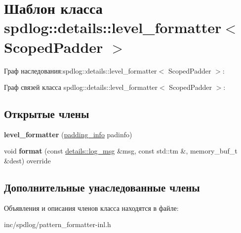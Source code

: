 \hypertarget{classspdlog_1_1details_1_1level__formatter}{}\section{Шаблон класса spdlog\+:\+:details\+:\+:level\+\_\+formatter$<$ Scoped\+Padder $>$}
\label{classspdlog_1_1details_1_1level__formatter}


Граф наследования\+:spdlog\+:\+:details\+:\+:level\+\_\+formatter$<$ Scoped\+Padder $>$\+:


Граф связей класса spdlog\+:\+:details\+:\+:level\+\_\+formatter$<$ Scoped\+Padder $>$\+:
\subsection*{Открытые члены}
\begin{DoxyCompactItemize}
\item 
\mbox{\label{classspdlog_1_1details_1_1level__formatter_a525f5622677202953cab0207f26ebd37}} 
{\bfseries level\+\_\+formatter} (\hyperlink{structspdlog_1_1details_1_1padding__info}{padding\+\_\+info} padinfo)
\item 
\mbox{\label{classspdlog_1_1details_1_1level__formatter_a051b5822e83ffc9ba0ff5742701858eb}} 
void {\bfseries format} (const \hyperlink{structspdlog_1_1details_1_1log__msg}{details\+::log\+\_\+msg} \&msg, const std\+::tm \&, memory\+\_\+buf\+\_\+t \&dest) override
\end{DoxyCompactItemize}
\subsection*{Дополнительные унаследованные члены}


Объявления и описания членов класса находятся в файле\+:\begin{DoxyCompactItemize}
\item 
inc/spdlog/pattern\+\_\+formatter-\/inl.\+h\end{DoxyCompactItemize}
